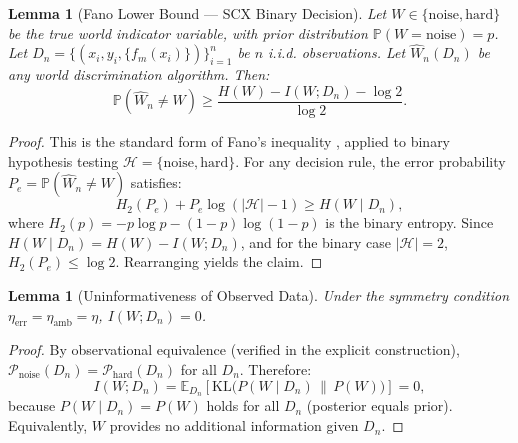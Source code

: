 \documentclass[12pt,a4paper]{article}
\newtheorem{lemma}[theorem]{Lemma}
\theoremstyle{definition}
\theoremstyle{remark}
\begin{document}
\begin{lemma}[Fano Lower Bound --- SCX Binary Decision]
\label{lem:fano-thm3}
Let $W \in \{\text{noise}, \text{hard}\}$ be the true world indicator variable, with prior distribution $\mathbb{P}(W = \text{noise}) = p$. Let $D_n = \{(x_i, y_i, \{f_m(x_i)\})\}_{i=1}^n$ be $n$ i.i.d. observations. Let $\hat{W}_n(D_n)$ be any world discrimination algorithm. Then:
\begin{equation}
\mathbb{P}(\hat{W}_n \neq W) \geq \frac{H(W) - I(W; D_n) - \log 2}{\log 2}.
\end{equation}
\end{lemma}
\begin{proof}
This is the standard form of Fano's inequality \cite{fano1961,cover2006}, applied to binary hypothesis testing $\mathcal{H} = \{\text{noise}, \text{hard}\}$. For any decision rule, the error probability $P_e = \mathbb{P}(\hat{W}_n \neq W)$ satisfies:
\begin{equation}
H_2(P_e) + P_e \log(|\mathcal{H}|-1) \geq H(W \mid D_n),
\end{equation}
where $H_2(p) = -p\log p - (1-p)\log(1-p)$ is the binary entropy. Since $H(W \mid D_n) = H(W) - I(W; D_n)$, and for the binary case $|\mathcal{H}|=2$, $H_2(P_e) \leq \log 2$. Rearranging yields the claim.
\end{proof}

\begin{lemma}[Uninformativeness of Observed Data]
\label{lem:zero-mi}
Under the symmetry condition $\eta_{\text{err}} = \eta_{\text{amb}} = \eta$, $I(W; D_n) = 0$.
\end{lemma}
\begin{proof}
By observational equivalence (verified in the explicit construction), $\mathcal{P}_{\text{noise}}(D_n) = \mathcal{P}_{\text{hard}}(D_n)$ for all $D_n$. Therefore:
\begin{equation}
I(W; D_n) = \mathbb{E}_{D_n}\left[\mathrm{KL}\big(P(W \mid D_n) \,\big\|\, P(W)\big)\right] = 0,
\end{equation}
because $P(W \mid D_n) = P(W)$ holds for all $D_n$ (posterior equals prior). Equivalently, $W$ provides no additional information given $D_n$.
\end{proof}
\end{document}
